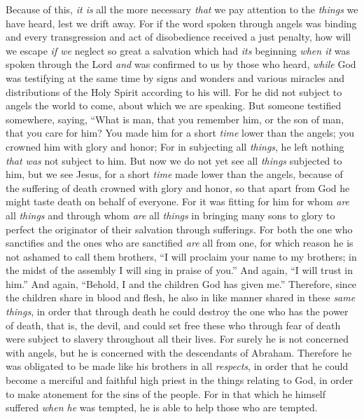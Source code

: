 \begin{biblechapter} %
 Because of this, \textit{it is} all the more necessary \textit{that} we pay attention to the \textit{things} we have heard, lest we drift away.
\verse For if the word spoken through angels was binding and every transgression and act of disobedience received a just penalty,
\verse how will we escape \textit{if we} neglect so great a salvation which had \textit{its} beginning \textit{when it} was spoken through the Lord \textit{and} was confirmed to us by those who heard,
\verse \textit{while} God was testifying at the same time by signs and wonders and various miracles and distributions of the Holy Spirit according to his will.
 For he did not subject to angels the world to come, about which we are speaking.
\verse But someone testified somewhere, saying,
\verse “What is man, that you remember him, 
or the son of man, that you care for him?
\verse You made him for a short \textit{time} lower than the angels; 
you crowned him with glory and honor;
\verse For in subjecting all \textit{things}, he left nothing \textit{that was} not subject to him. But now we do not yet see all \textit{things} subjected to him,
\verse but we see Jesus, for a short \textit{time} made lower than the angels, because of the suffering of death crowned with glory and honor, so that apart from God he might taste death on behalf of everyone.
\verse For it was fitting for him for whom \textit{are} all \textit{things} and through whom \textit{are} all \textit{things} in bringing many sons to glory to perfect the originator of their salvation through sufferings.
\verse For both the one who sanctifies and the ones who are sanctified \textit{are} all from one, for which reason he is not ashamed to call them brothers, “I will proclaim your name to my brothers; 
in the midst of the assembly I will sing in praise of you.”
\verse And again, “I will trust in him.” And again, “Behold, I and the children God has given me.”
\verse Therefore, since the children share in blood and flesh, he also in like manner shared in these \textit{same things}, in order that through death he could destroy the one who has the power of death, that is, the devil,
\verse and could set free these who through fear of death were subject to slavery throughout all their lives.
\verse For surely he is not concerned with angels, but he is concerned with the descendants of Abraham.
\verse Therefore he was obligated to be made like his brothers in all \textit{respects}, in order that he could become a merciful and faithful high priest in the things relating to God, in order to make atonement for the sins of the people.
\verse For in that which he himself suffered \textit{when he} was tempted, he is able to help those who are tempted.
\end{biblechapter}


